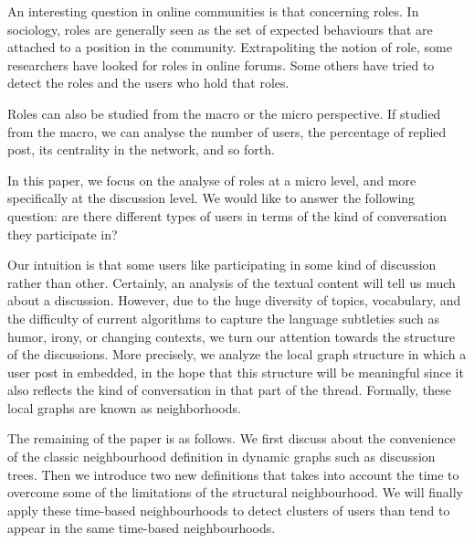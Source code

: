 \documentclass[9pt,technote]{IEEEtran}
\begin{document}
An interesting question in online communities is that concerning roles. In sociology, roles are generally seen as the set of expected behaviours that are attached  to a position in the community. Extrapoliting the notion of role, some researchers have looked for roles in online forums. Some others have tried to detect the roles and the users who hold that roles.

Roles can also be studied from the macro or the micro perspective. If studied from the macro, we can analyse the number of users, the percentage of replied post, its centrality in the network, and  so forth.

In this paper, we focus on the analyse of roles at a micro level, and more specifically at the discussion level. We would like to answer the following question: are there different types of users in terms of the kind of conversation they participate in?


Our intuition is that some users like participating in some kind of discussion rather than other. Certainly, an analysis of the textual content will tell us much about a discussion. However, due to the huge diversity of topics, vocabulary, and the difficulty of current algorithms to capture the language subtleties such as humor, irony, or changing contexts, we turn our attention towards the structure of the discussions. More precisely, we analyze the local graph structure in which a user post in embedded, in the hope that this structure will be meaningful since it also reflects the kind of conversation in that part of the thread. Formally, these local graphs are known as neighborhoods.


The remaining of the paper is as follows. We first discuss about the convenience of the classic neighbourhood definition in dynamic graphs such as discussion trees. Then we introduce two new definitions that takes into account the time to overcome some of the limitations of the structural neighbourhood. We will finally apply these time-based neighbourhoods to detect clusters of users than tend to appear in the same time-based neighbourhoods.
\end{document}
